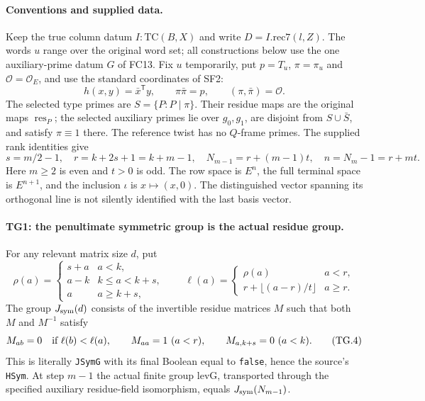 \documentclass[11pt,a4paper]{article}
\numberwithin{equation}{section}
\theoremstyle{remark}\newtheorem{remark}[theorem]{Remark}
\begin{document}
\paragraph{Conventions and supplied data.}
Keep the true column datum $I:\mathrm{TC}(B,X)$ and write
$D=I.\mathrm{rec7}(l,Z)$. The words $u$ range over the original word
set; all constructions below use the one auxiliary-prime datum $G$ of
FC13. Fix $u$ temporarily, put $p=T_u$, $\pi=\pi_u$ and
$\mathcal O=\mathcal O_E$, and use the standard coordinates of SF2:
\[
 h(x,y)=\bar x^{\mathsf T}y,\qquad
 \pi\bar\pi=p,\qquad(\pi,\bar\pi)=\mathcal O.
 \tag{TG.1}
\]
The selected type primes are $S=\{P:P\mid\pi\}$. Their residue
maps are the original maps $\operatorname{res}_P$; the selected
auxiliary primes lie over $g_0,g_1$, are disjoint from $S\cup\bar S$,
and satisfy $\pi\equiv1$ there. The reference twist has no $Q$-frame
primes. The supplied rank identities give
\[
 s=m/2-1,\quad r=k+2s+1=k+m-1,\quad
 N_{m-1}=r+(m-1)t,\quad n=N_m-1=r+mt.
 \tag{TG.2}
\]
Here $m\ge2$ is even and $t>0$ is odd. The row space is $E^n$,
the full terminal space is $E^{n+1}$, and the inclusion $\iota$ is
$x\mapsto(x,0)$. The distinguished vector spanning its orthogonal
line is not silently identified with the last basis vector.

\paragraph{TG1: the penultimate symmetric group is the actual residue group.}
For any relevant matrix size $d$, put
\[
 \rho(a)=
 \begin{cases}s+a&a<k,\\a-k&k\le a<k+s,\\a&a\ge k+s,
 \end{cases}
 \qquad
 \ell(a)=
 \begin{cases}\rho(a)&a<r,\\r+\lfloor(a-r)/t\rfloor&a\ge r.
 \end{cases}
 \tag{TG.3}
\]
The group $J_{\rm sym}(d)$ consists of the invertible residue
matrices $M$ such that both $M$ and $M^{-1}$ satisfy
\[
 M_{ab}=0\quad\hbox{if }\ell(b)<\ell(a),\qquad
 M_{aa}=1\ (a<r),\qquad M_{a,k+s}=0\ (a<k).
 \tag{TG.4}
\]
This is literally \texttt{JSymG} with its final Boolean equal to
\texttt{false}, hence the source's \texttt{HSym}. At step $m-1$
the actual finite group $\mathrm{levG}$, transported through the
specified auxiliary residue-field isomorphism, equals
$J_{\rm sym}(N_{m-1})$.
\end{document}
